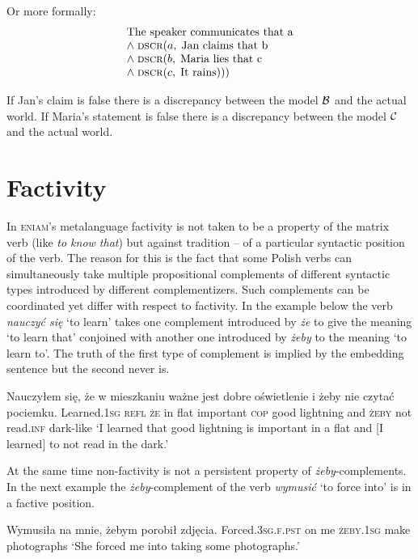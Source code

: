 \documentclass[11pt]{article}
\newcommand{\eniam}{\textsc{eniam}}
\begin{document}
Or more formally:
\begin{multline}
\begin{array}{l}
  \text{The speaker communicates that a}\\
  \wedge\; \textsc{dscr}(a,\; \text{Jan claims that b}\\
  \wedge\; \textsc{dscr}(b,\; \text{Maria lies that c}\\
  \wedge\; \textsc{dscr}(c,\; \text{It rains})))
\end{array}
\end{multline}

If Jan's claim is false there is a discrepancy between the model $\cal{B}$ and the actual world.
If Maria's statement is false there is a discrepancy between the model $\cal{C}$ and the actual world.

\section{Factivity}
In \eniam's metalanguage factivity is not taken to be a property of the matrix verb (like \textit{to know that}) but against tradition -- of a particular syntactic position of the verb. The reason for this is the fact that some Polish verbs can simultaneously take multiple propositional complements of different syntactic types introduced by different complementizers. Such complements can be coordinated yet differ with respect to factivity. In the example below the verb \textit{nauczyć się} `to learn' takes one complement introduced by \textit{że} to give the meaning `to learn that' conjoined with another one introduced by \textit{żeby} to the meaning `to learn to'. The truth of the first type of complement is implied by the embedding sentence but the second never is.

\begin{examples}
  \item \label{nauczyc_sie}
  \gll Nauczyłem się, że w mieszkaniu ważne jest dobre oświetlenie i żeby nie czytać po\;ciemku.
  Learned.\textsc{1sg} \textsc{refl} \textsc{że} in flat important \textsc{cop} good lightning and \textsc{żeby} not read.\textsc{inf} dark-like
  \glt `I learned that good lightning is important in a flat and [I learned] to not read in the dark.'
  \glend 
\end{examples}

At the same time non-factivity is not a persistent property of \textit{żeby}-complements. In the next example the \textit{żeby}-complement of the verb \textit{wymusić} `to force into' is in a factive position.
\begin{examples}
  \item \label{wymusic}
  \gll Wymusiła na mnie, żebym porobił zdjęcia.
  Forced.\textsc{3sg.f.pst} on me \textsc{żeby.1sg} make photographs
  \glt `She forced me into taking some photographs.'
  \glend 
\end{examples}
\end{document}
